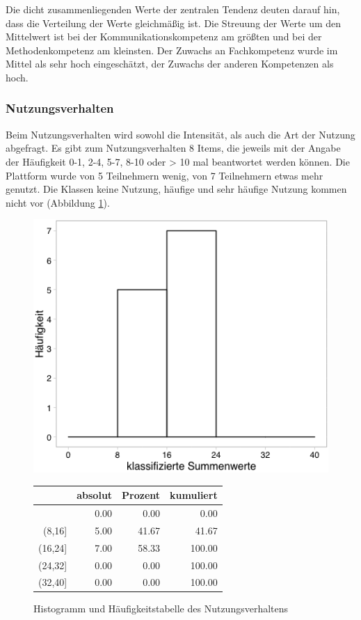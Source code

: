 \documentclass[12pt,smallheadings, bibliography=totoc]{scrartcl}
\begin{document}
Die dicht zusammenliegenden Werte der zentralen Tendenz deuten darauf
hin, dass die Verteilung der Werte gleichmäßig ist. Die Streuung der
Werte um den Mittelwert ist bei der Kommunikationskompetenz am größten
und bei der Methodenkompetenz am kleinsten. Der Zuwachs an Fachkompetenz
wurde im Mittel als sehr hoch eingeschätzt, der Zuwachs der anderen
Kompetenzen als hoch.

\subsubsection{Nutzungsverhalten}\label{nutzungsverhalten}

Beim Nutzungsverhalten wird sowohl die Intensität, als auch die Art der
Nutzung abgefragt. Es gibt zum Nutzungsverhalten 8 Items, die jeweils
mit der Angabe der Häufigkeit 0-1, 2-4, 5-7, 8-10 oder \textgreater{} 10
mal beantwortet werden können. Die Plattform wurde von 5 Teilnehmern
wenig, von 7 Teilnehmern etwas mehr genutzt. Die Klassen keine Nutzung,
häufige und sehr häufige Nutzung kommen nicht vor (Abbildung
\ref{fig:NV}).

\begin{figure}[H]
\begin{minipage}{.4\linewidth}
\includegraphics[width=0.8\linewidth]{Anhang/NVHistnn.png}

\label{pic:aufbau}
\end{minipage}
\begin{minipage}{.4\linewidth}
\centering
\raisebox{\depth}
{\begin{tabular}{rrrr}
  \hline
 & absolut & Prozent & kumuliert \\ 
  \hline
[8] & 0.00 & 0.00 & 0.00 \\ 
  (8,16] & 5.00 & 41.67 & 41.67 \\ 
  (16,24] & 7.00 & 58.33 & 100.00 \\ 
  (24,32] & 0.00 & 0.00 & 100.00 \\ 
  (32,40] & 0.00 & 0.00 & 100.00 \\ 
   \hline
\end{tabular}

}
\label{tab:defis}
\end{minipage}
\caption{Histogramm und Häufigkeitstabelle des Nutzungsverhaltens}
\label{fig:NV}
\end{figure}
\end{document}
